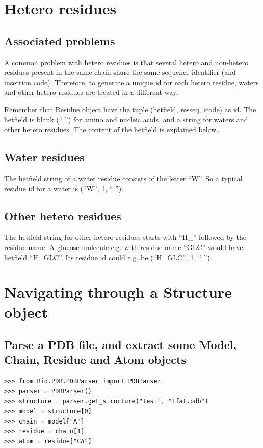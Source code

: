 \section{Hetero residues}

\subsection{Associated problems}
\label{sec:hetero_problems}

A common problem with hetero residues is that several hetero and non-hetero
residues present in the same chain share the same sequence identifier (and insertion
code). Therefore, to generate a unique id for each hetero residue, waters and
other hetero residues are treated in a different way.

Remember that Residue object have the tuple (hetfield, resseq, icode) as id.
The hetfield is blank (`` '') for amino and nucleic acids, and a string
for waters and other hetero residues. The content of the hetfield is explained
below.

\subsection{Water residues}

The hetfield string of a water residue consists of the letter ``W''. So
a typical residue id for a water is (``W'', 1, `` '').

\subsection{Other hetero residues}

The hetfield string for other hetero residues starts with ``H\_'' followed
by the residue name. A glucose molecule e.g. with residue name ``GLC''
would have hetfield ``H\_GLC''. Its residue id could e.g. be (``H\_GLC'',
1, `` '').

\section{Navigating through a Structure object}

\subsection*{Parse a PDB file, and extract some Model, Chain, Residue and Atom objects}

\begin{verbatim}
>>> from Bio.PDB.PDBParser import PDBParser
>>> parser = PDBParser()
>>> structure = parser.get_structure("test", "1fat.pdb")
>>> model = structure[0]
>>> chain = model["A"]
>>> residue = chain[1]
>>> atom = residue["CA"]
\end{verbatim}

